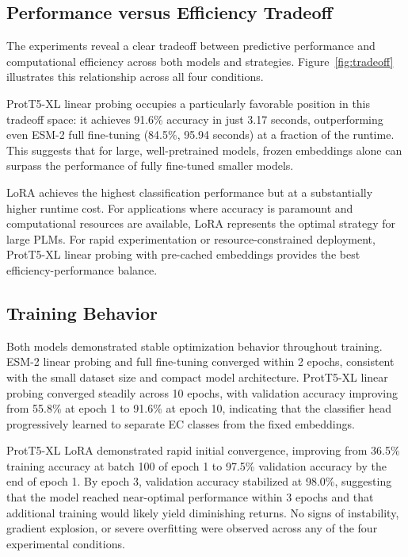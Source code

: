 \documentclass{article}
\begin{document}
\subsection{Performance versus Efficiency Tradeoff}

The experiments reveal a clear tradeoff between predictive performance and computational efficiency across both models and strategies. Figure~\ref{fig:tradeoff} illustrates this relationship across all four conditions.

ProtT5-XL linear probing occupies a particularly favorable position in this tradeoff space: it achieves 91.6\% accuracy in just 3.17 seconds, outperforming even ESM-2 full fine-tuning (84.5\%, 95.94 seconds) at a fraction of the runtime. This suggests that for large, well-pretrained models, frozen embeddings alone can surpass the performance of fully fine-tuned smaller models.

LoRA achieves the highest classification performance but at a substantially higher runtime cost. For applications where accuracy is paramount and computational resources are available, LoRA represents the optimal strategy for large PLMs. For rapid experimentation or resource-constrained deployment, ProtT5-XL linear probing with pre-cached embeddings provides the best efficiency-performance balance.

\subsection{Training Behavior}

Both models demonstrated stable optimization behavior throughout training. ESM-2 linear probing and full fine-tuning converged within 2 epochs, consistent with the small dataset size and compact model architecture. ProtT5-XL linear probing converged steadily across 10 epochs, with validation accuracy improving from 55.8\% at epoch 1 to 91.6\% at epoch 10, indicating that the classifier head progressively learned to separate EC classes from the fixed embeddings.

ProtT5-XL LoRA demonstrated rapid initial convergence, improving from 36.5\% training accuracy at batch 100 of epoch 1 to 97.5\% validation accuracy by the end of epoch 1. By epoch 3, validation accuracy stabilized at 98.0\%, suggesting that the model reached near-optimal performance within 3 epochs and that additional training would likely yield diminishing returns. No signs of instability, gradient explosion, or severe overfitting were observed across any of the four experimental conditions.
\end{document}
